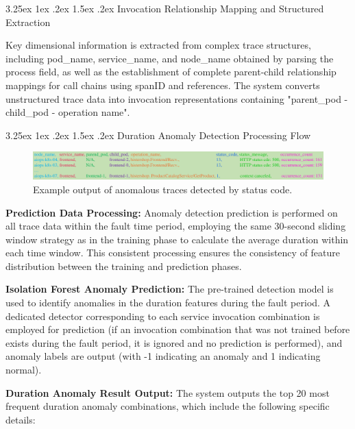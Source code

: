 \documentclass[10pt]{article}
\makeatletter
\renewcommand{\paragraph}{%
    \@startsection{paragraph}{4}{\z@}%
    {3.25ex \@plus1ex \@minus.2ex}%
    {1.5ex \@plus.2ex}%
    {\normalfont\normalsize\itshape}%
}
\makeatother
\begin{document}
\paragraph{Invocation Relationship Mapping and Structured Extraction}

Key dimensional information is extracted from complex trace structures, including pod\_name, service\_name, and node\_name obtained by parsing the process field, as well as the establishment of complete parent-child relationship mappings for call chains using spanID and references. The system converts unstructured trace data into invocation representations containing "parent\_pod - child\_pod - operation name".

\paragraph{Duration Anomaly Detection Processing Flow}

\begin{figure}[htbp]
    \centering
    \includegraphics[width=1.0\textwidth]{fig11.pdf}
    \caption{Example output of anomalous traces detected by status code.}
    \label{fig11}
\end{figure}

\textbf{Prediction Data Processing:} Anomaly detection prediction is performed on all trace data within the fault time period, employing the same 30-second sliding window strategy as in the training phase to calculate the average duration within each time window. This consistent processing ensures the consistency of feature distribution between the training and prediction phases.

\textbf{Isolation Forest Anomaly Prediction:} The pre-trained detection model is used to identify anomalies in the duration features during the fault period. A dedicated detector corresponding to each service invocation combination is employed for prediction (if an invocation combination that was not trained before exists during the fault period, it is ignored and no prediction is performed), and anomaly labels are output (with -1 indicating an anomaly and 1 indicating normal).

\textbf{Duration Anomaly Result Output:} The system outputs the top 20 most frequent duration anomaly combinations, which include the following specific details:
\end{document}
